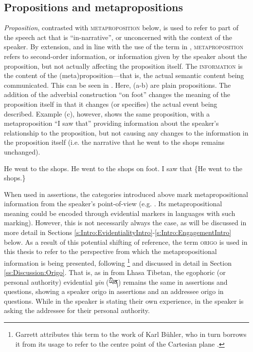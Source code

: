 \subsection{Propositions and metapropositions}
\textit{Proposition}, contrasted with \textsc{metaproposition} below, is used to refer to part of the speech act that is ``in-narrative'', or unconcerned with the context of the speaker. By extension, and in line with the use of the term in , \textsc{metaproposition} refers to second-order information, or information given by the speaker about the proposition, but not actually affecting the proposition itself. The \textsc{information} is the content of the (meta)proposition---that is, the actual semantic content being communicated. This can be seen in . Here, (a-b) are plain propositions. The addition of the adverbial construction ``on foot'' changes the meaning of the proposition itself in that it changes (or specifies) the actual event being described. Example (c), however, shows the same proposition, with a metaproposition ``I saw that'' providing information about the speaker's relationship to the proposition, but not causing any changes to the information in the proposition itself (i.e. the narrative that he went to the shops remains unchanged).

\begin{exe}
\ex\label{ex:MetapropEnglish}
\begin{xlist}
\ex He went to the shops.
\ex He went to the shops on foot.
\ex I saw that \{He went to the shops.\}\label{ex:MetapropEnglish:c}
\end{xlist}
\end{exe}

When used in assertions, the categories introduced above mark metapropositional information from the speaker's point-of-view (e.g. . Its metapropositional meaning could be encoded through evidential markers in languages with such marking). However, this is not necessarily always the case, as will be discussed in more detail in Sections \ref{s:Intro:EvidentialityIntro}-\ref{s:Intro:EngagementIntro} below. As a result of this potential shifting of reference, the term \textsc{origo} is used in this thesis to refer to the perspective from which the metapropositional information is being presented, following \footnote{Garrett attributes this term to the work of Karl Bühler, who in turn borrows it from its usage to refer to the centre point of the Cartesian plane \cite{Buehler1965}.} and discussed in detail in Section \ref{ss:Discussion:Origo}. That is, as in  from Lhasa Tibetan, the egophoric (or personal authority) evidential \textit{yin} (\foreignlanguage{tibetan}{ཡིན}) remains the same in assertions and questions, showing a speaker origo in assertions and an addressee origo in questions. While in  the speaker is stating their own experience, in  the speaker is asking the addressee for their personal authority.

